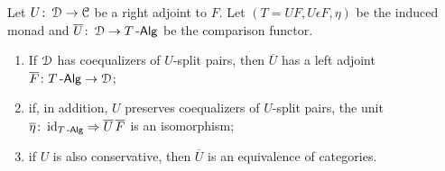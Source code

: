 \documentclass[a4paper,11pt,oneside,openany]{scrbook}
\begin{document}
\begin{teo}[Beck]\label{Beck} Let $U\colon\operatorname{\mathcal{D}}\to\operatorname{\mathcal{C}}$ be a right adjoint to $F$.
	Let $(T=UF, U\epsilon F, \eta)$ be the induced monad and
	$\overline{U}\colon\operatorname{\mathcal{D}}\to T\operatorname{-\mathsf{Alg}}$ be the comparison functor.
	\begin{enumerate}
		\item If $\operatorname{\mathcal{D}}$ has coequalizers of $U$-split pairs, then $\overline{U}$ has a left adjoint $\overline{F}\colon T\operatorname{-\mathsf{Alg}}\to\operatorname{\mathcal{D}}$;
		\item if, in addition, $U$ preserves coequalizers of $U$-split pairs, the unit $\overline{\eta}\colon\operatorname{id}_{T\operatorname{-\mathsf{Alg}}}\Rightarrow\overline{U}\hspace{.5mm} \overline{F}$ is an isomorphism;
		\item if $U$ is also conservative, then $\overline{U}$ is an equivalence of categories.
	\end{enumerate}
\end{teo}
\end{document}
